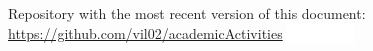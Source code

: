 \documentclass[12pt]{article}
\newcommand{\marker}{\colorbox{white}{\textcolor{white}{\tiny{\today \, \currenttime}}}}
\begin{document}






Repository with the most recent version of this document:
\url{https://github.com/vil02/academicActivities}
\marker{}
\end{document}
